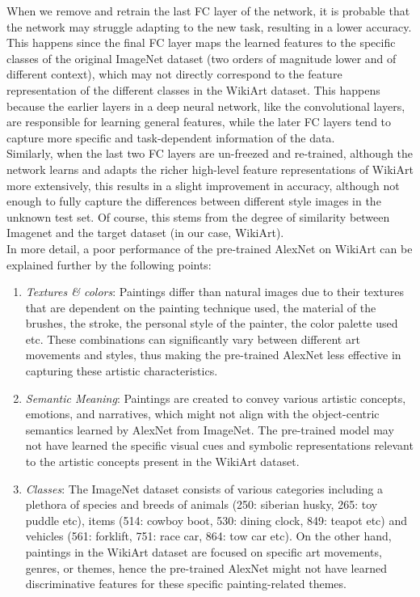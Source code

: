 \documentclass{article}
\begin{document}
	When we remove and retrain the last FC layer of the network, it is probable that the network may struggle adapting to the new task, resulting in a lower accuracy. This happens since the final FC layer maps the learned features to the specific classes of the original ImageNet dataset (two orders of magnitude lower and of different context), which may not directly correspond to the feature representation of the different classes in the WikiArt dataset. This happens because the earlier layers in a deep neural network, like the convolutional layers, are responsible for learning general features, while the later FC layers tend to capture more specific and task-dependent information of the data.
	\\
	
	Similarly, when the last two FC layers are un-freezed and re-trained, although the network learns and adapts the richer high-level feature representations of WikiArt more extensively, this results in a slight improvement in accuracy, although not enough to fully capture the differences between different style images in the unknown test set. Of course, this stems from the degree of similarity between Imagenet and the target dataset (in our case, WikiArt). \\
	
	In more detail, a poor performance of the pre-trained AlexNet on WikiArt can be explained further by the following points: \\
	
	\begin{enumerate}[I]
		\item \textit{Textures \& colors}: Paintings differ than natural images due to their textures that are dependent on the painting technique used, the material of the brushes, the stroke, the personal style of the painter, the color palette used etc. These combinations can significantly vary between different art movements and styles, thus making the pre-trained AlexNet less effective in capturing these artistic characteristics.
		
		\item \textit{Semantic Meaning}: Paintings are created to convey various artistic concepts, emotions, and narratives, which might not align with the object-centric semantics learned by AlexNet from ImageNet. The pre-trained model may not have learned the specific visual cues and symbolic representations relevant to the artistic concepts present in the WikiArt dataset.
		
		\item \textit{Classes}: The ImageNet dataset consists of various categories including a plethora of species and breeds of animals (250: siberian husky, 265: toy puddle etc), items (514: cowboy boot, 530: dining clock, 849: teapot etc) and vehicles (561: forklift, 751: race car, 864: tow car etc). On the other hand, paintings in the WikiArt dataset are focused on specific art movements, genres, or themes, hence the pre-trained AlexNet might not have learned discriminative features for these specific painting-related themes.
	\end{enumerate}
\end{document}
